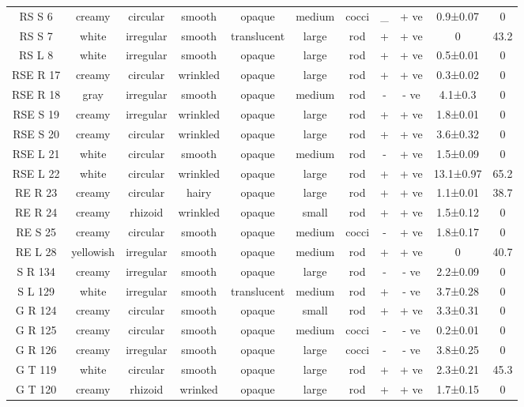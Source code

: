 \documentclass[sn-mathphys,Numbered]{sn-jnl}%
\theoremstyle{thmstyleone}%
\theoremstyle{thmstyletwo}%
\theoremstyle{thmstylethree}%
\begin{document}
\begin{table}
\begin{tabular}{@{\extracolsep{5pt}} ccccccccccc}
RS S 6 & creamy & circular & smooth & opaque & medium & cocci & \_ & + ve & 0.9±0.07 & 0 \\ 
RS S 7 & white & irregular & smooth & translucent & large & rod & + & + ve & 0 & 43.2 \\ 
RS L 8 & white & irregular & smooth & opaque & large & rod & + & + ve & 0.5±0.01 & 0 \\ 
RSE R 17 & creamy & circular & wrinkled & opaque & large & rod & + & + ve & 0.3±0.02 & 0 \\ 
RSE R 18 & gray & irregular & smooth & opaque & medium & rod & - & - ve & 4.1±0.3 & 0 \\ 
RSE S 19 & creamy & irregular & wrinkled & opaque & large & rod & + & + ve & 1.8±0.01 & 0 \\ 
RSE S 20 & creamy & circular & wrinkled & opaque & large & rod & + & + ve & 3.6±0.32 & 0 \\ 
RSE L 21 & white & circular & smooth & opaque & medium & rod & - & + ve & 1.5±0.09 & 0 \\ 
RSE L 22 & white & circular & wrinkled & opaque & large & rod & + & + ve & 13.1±0.97 & 65.2 \\ 
RE R 23 & creamy & circular & hairy & opaque & large & rod & + & + ve & 1.1±0.01 & 38.7 \\ 
RE R 24 & creamy & rhizoid & wrinkled & opaque & small & rod & + & + ve & 1.5±0.12 & 0 \\ 
RE S 25 & creamy & circular & smooth & opaque & medium & cocci & - & + ve & 1.8±0.17 & 0 \\ 
RE L 28 & yellowish & irregular & smooth & opaque & medium & rod & + & + ve & 0 & 40.7 \\ 
S R 134 & creamy & irregular & smooth & opaque & large & rod & - & - ve & 2.2±0.09 & 0 \\ 
S L 129 & white & irregular & smooth & translucent & medium & rod & + & - ve & 3.7±0.28 & 0 \\ 
G R 124 & creamy & circular & smooth & opaque & small & rod & + & + ve & 3.3±0.31 & 0 \\ 
G R 125 & creamy & circular & smooth & opaque & medium & cocci & - & - ve & 0.2±0.01 & 0 \\ 
G R 126 & creamy & irregular & smooth & opaque & large & cocci & - & - ve & 3.8±0.25 & 0 \\ 
G T 119 & white & circular & smooth & opaque & large & rod & + & + ve & 2.3±0.21 & 45.3 \\ 
G T 120 & creamy & rhizoid & wrinked & opaque & large & rod & + & + ve & 1.7±0.15 & 0 \\ 

\end{tabular}
\end{table}
\end{document}
